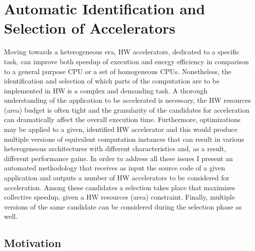 \documentclass[]{usiinfthesis}
\begin{document}

%
%
%
%
%  
%
%
%
%
%

\chapter%
{Automatic Identification and Selection of Accelerators}

Moving towards a heterogeneous era, HW accelerators, dedicated to a specific task, can
improve both speedup of execution and energy efficiency in comparison to a general 
purpose CPU or a set of homogeneous CPUs. Nonetheless, the identification and selection 
of which parts of the computation are to be implemented in HW is a complex and demanding task. 
A thorough understanding of the application to be accelerated is necessary, the HW resources
(area) budget is often tight and the granularity of the candidates for acceleration 
can dramatically affect the overall execution time. Furthermore, optimizations may be applied
to a given, identified HW accelerator and this would produce multiple versions of equivalent
computation instances that can result in various heterogeneous architectures with different
characteristics and, as a result, different performance gains.
In order to address all these issues I present an automated methodology
that receives as input the source code of a given application and outputs a number of 
HW accelerators to be considered for acceleration. Among these candidates a selection takes 
place that maximizes collective speedup, given a HW resources (area) constraint. Finally, 
multiple versions of the same candidate can be considered during the selection phase as well.

\section{Motivation}
\label{sec:mot}
\end{document}
